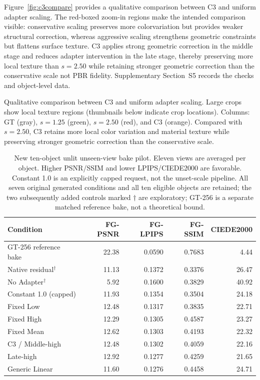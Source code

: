 \documentclass[times,twocolumn,final]{elsarticle}
\providecommand{\DIFadd}[1]{{\protect\color{blue} \sf #1}} %
\providecommand{\DIFdel}[1]{{\protect\color{red} \scriptsize #1}} %
\providecommand{\DIFaddbegin}{} %
\providecommand{\DIFaddend}{} %
\providecommand{\DIFdelbegin}{} %
\providecommand{\DIFdelend}{} %
\providecommand{\DIFdelFL}[1]{\DIFdel{#1}} %
\begin{document}
\DIFdel{Figure~\ref{fig:c3compare} provides a qualitative comparison between C3 and uniform adapter scaling. The red-boxed zoom-in regions make the intended comparison visible: conservative scaling preserves more colorvariation but provides weaker structural correction, whereas aggressive scaling strengthens geometric constraints but flattens surface texture. C3 applies strong geometric correction in the middle stage and reduces adapter intervention in the late stage, thereby preserving more local texture than $s = 2.50$ while retaining stronger geometric correction than the conservative scale}\DIFdelend \DIFaddbegin \DIFadd{not PBR fidelity. Supplementary Section~S5 records the checks and object-level data}\DIFaddend .

\DIFdelbegin %
{%
\DIFdelFL{Qualitative comparison between C3 and uniform adapter scaling. Large crops show local texture regions (thumbnails below indicate crop locations). Columns: GT (gray), $s = 1.25$ (green), $s = 2.50$ (red), and C3 (orange). Compared with $s = 2.50$, C3 retains more local color variation and material texture while preserving stronger geometric correction than the conservative scale.}}
\DIFdelend \DIFaddbegin \begin{table}[ht]
\centering\scriptsize
\caption{New ten-object unlit unseen-view bake pilot. Eleven views are averaged per object. Higher PSNR/SSIM and lower LPIPS/CIEDE2000 are favorable. Constant 1.0 is an explicitly capped request, not the unset-scale pipeline. All seven original generated conditions and all ten eligible objects are retained; the two subsequently added controls marked $\dagger$ are exploratory; GT-256 is a separate matched reference bake, not a theoretical bound.}
\label{tab:new-bake}
\begin{tabular}{lrrrr}
\toprule Condition & FG-PSNR & FG-LPIPS & FG-SSIM & CIEDE2000 \\
\midrule
GT-256 reference bake & 22.38 & 0.0590 & 0.7683 & 4.44 \\
\midrule
Native residual$^\dagger$ & 11.13 & 0.1372 & 0.3376 & 26.47 \\
No Adapter$^\dagger$ & 5.92 & 0.1600 & 0.3829 & 40.92 \\
Constant 1.0 (capped) & 11.93 & 0.1354 & 0.3504 & 24.18 \\
Fixed Low & 12.48 & 0.1317 & 0.3835 & 22.71 \\
Fixed High & 12.29 & 0.1305 & 0.4587 & 23.27 \\
Fixed Mean & 12.62 & 0.1303 & 0.4193 & 22.32 \\
C3 / Middle-high & 12.48 & 0.1302 & 0.4059 & 22.16 \\
Late-high & 12.92 & 0.1277 & 0.4259 & 21.65 \\
Generic Linear & 11.60 & 0.1276 & 0.4458 & 24.71 \\
\bottomrule\end{tabular}
\end{table}
\DIFaddend 
\end{document}

